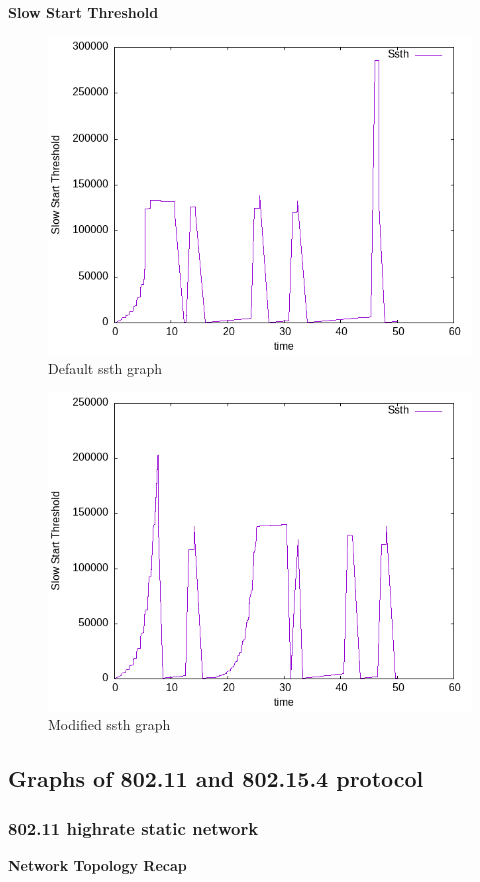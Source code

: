 \documentclass{article}[12pt]
\begin{document}
\newpage
\textbf{Slow Start Threshold}
\begin{figure}[H]
	\centering
	\includegraphics[height=0.6\textwidth]{Pictures/rtt/175/b/ssth_graph.png}
	\caption{Default ssth graph}
\end{figure}   


\begin{figure}[H]
	\centering
	\includegraphics[height=0.6\textwidth]{Pictures/rtt/175/m/ssth_graph.png}
	\caption{Modified ssth graph}
\end{figure}   


\newpage
\subsection{Graphs of 802.11 and 802.15.4 protocol} 
\subsubsection{802.11 highrate static network}
\textbf{Network Topology Recap}
\end{document}
